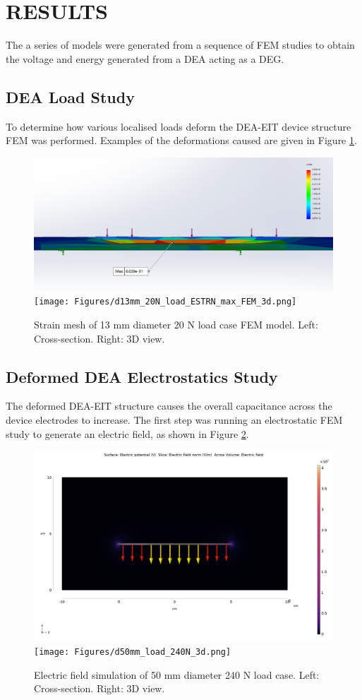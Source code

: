 \section{RESULTS}
\label{sec:results}
The a series of models were generated from a sequence of FEM studies to obtain the voltage and energy generated from a DEA acting as a DEG.


\subsection{DEA Load Study}
To determine how various localised loads deform the DEA-EIT device structure FEM was performed. Examples of the deformations caused are given in Figure \ref{fig:FEM_DEA-EIT_loading}.
\begin{figure}[H]
	\centering
	\includegraphics[width=0.6\linewidth]{Figures/d13mm_20N_load_ESTRN_max_FEM.png}
	\texttt{[image: Figures/d13mm\_20N\_load\_ESTRN\_max\_FEM\_3d.png]}
	\caption{Strain mesh of 13 mm diameter 20 N load case FEM model. Left: Cross-section. Right: 3D view.}
	\label{fig:FEM_DEA-EIT_loading}
\end{figure}


\subsection{Deformed DEA Electrostatics Study}
The deformed DEA-EIT structure causes the overall capacitance across the device electrodes to increase. The first step was running an electrostatic FEM study to generate an electric field, as shown in Figure \ref{fig:FEM_DEA-EIT_cap}.
\begin{figure}[H]
	\centering
	\includegraphics[width=0.6\linewidth]{Figures/d50mm_load_240N.png}
	\texttt{[image: Figures/d50mm\_load\_240N\_3d.png]}
	\caption{Electric field simulation of 50 mm diameter 240 N load case. Left: Cross-section. Right: 3D view.}
	\label{fig:FEM_DEA-EIT_cap}
\end{figure}


